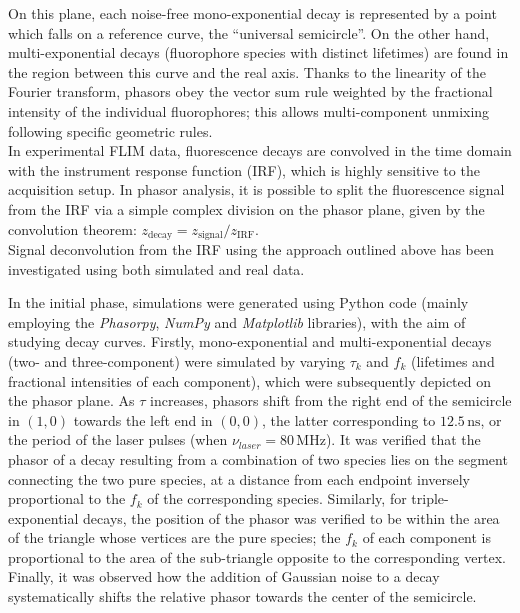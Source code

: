 \documentclass[a4paper, 11pt]{article}
\begin{document}
\noindent On this plane, each noise-free mono-exponential decay is represented by a point which falls on a reference curve, the ``universal semicircle''. On the other hand, multi-exponential decays (fluorophore species with distinct lifetimes) are found in the region between this curve and the real axis.
Thanks to the linearity of the Fourier transform, phasors obey the vector sum rule weighted by the fractional intensity of the individual fluorophores; this allows multi-component unmixing following specific geometric rules.\\
In experimental FLIM data, fluorescence decays are convolved in the time domain with the instrument response function (IRF), which is highly sensitive to the acquisition setup. In phasor analysis, it is possible to split the fluorescence signal from the IRF via a simple complex division on the phasor plane, given by the convolution theorem: $z_{\text{decay}} = z_{\text{signal}}/z_{\text{IRF}}$.\\
Signal deconvolution from the IRF using the approach outlined above has been investigated using both simulated and real data.

In the initial phase, simulations were generated using Python code (mainly employing the \textit{Phasorpy}, \textit{NumPy} and \textit{Matplotlib} libraries), with the aim of studying decay curves.
Firstly, mono-exponential and multi-exponential decays (two- and three-component) were simulated by varying $\tau_k$ and $f_k$ (lifetimes and fractional intensities of each component), which were subsequently depicted on the phasor plane. As $\tau$ increases, phasors shift from the right end of the semicircle in $(1, 0)$ towards the left end in $(0, 0)$, the latter corresponding to $12.5\,\text{ns}$, or the period of the laser pulses (when $\nu_{laser}=80\,\text{MHz}$).
It was verified that the phasor of a decay resulting from a combination of two species lies on the segment connecting the two pure species, at a distance from each endpoint inversely proportional to the $f_k$ of the corresponding species.
Similarly, for triple-exponential decays, the position of the phasor was verified to be within the area of the triangle whose vertices are the pure species; the $f_k$ of each component is proportional to the area of the sub-triangle opposite to the corresponding vertex.
Finally, it was observed how the addition of Gaussian noise to a decay systematically shifts the relative phasor towards the center of the semicircle.
\end{document}
